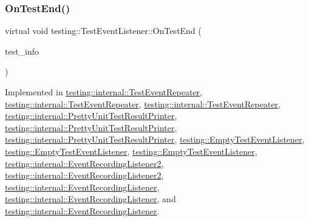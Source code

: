\subsubsection{\texorpdfstring{OnTestEnd()}{OnTestEnd()}\hspace{0.1cm}{\footnotesize\ttfamily [2/3]}}
{\footnotesize\ttfamily virtual void testing\+::\+Test\+Event\+Listener\+::\+On\+Test\+End (\begin{DoxyParamCaption}\item[{const \mbox{\hyperlink{classtesting_1_1_test_info}{Test\+Info}} \&}]{test\+\_\+info }\end{DoxyParamCaption})\hspace{0.3cm}{\ttfamily [pure virtual]}}



Implemented in \mbox{\hyperlink{classtesting_1_1internal_1_1_test_event_repeater_a0f524b2773bf2cbf6df1269975c5a79f}{testing\+::internal\+::\+Test\+Event\+Repeater}}, \mbox{\hyperlink{classtesting_1_1internal_1_1_test_event_repeater_a0f524b2773bf2cbf6df1269975c5a79f}{testing\+::internal\+::\+Test\+Event\+Repeater}}, \mbox{\hyperlink{classtesting_1_1internal_1_1_test_event_repeater_aa0f13bded9369aae1c78583d7276f8b1}{testing\+::internal\+::\+Test\+Event\+Repeater}}, \mbox{\hyperlink{classtesting_1_1internal_1_1_pretty_unit_test_result_printer_a085f90bb9f3128d8d8864c19e1e188ef}{testing\+::internal\+::\+Pretty\+Unit\+Test\+Result\+Printer}}, \mbox{\hyperlink{classtesting_1_1internal_1_1_pretty_unit_test_result_printer_a085f90bb9f3128d8d8864c19e1e188ef}{testing\+::internal\+::\+Pretty\+Unit\+Test\+Result\+Printer}}, \mbox{\hyperlink{classtesting_1_1internal_1_1_pretty_unit_test_result_printer_a6d4e21b076982d9eefb30373f1f5b6d2}{testing\+::internal\+::\+Pretty\+Unit\+Test\+Result\+Printer}}, \mbox{\hyperlink{classtesting_1_1_empty_test_event_listener_a709d7077c086c877d214231bc520ef90}{testing\+::\+Empty\+Test\+Event\+Listener}}, \mbox{\hyperlink{classtesting_1_1_empty_test_event_listener_a709d7077c086c877d214231bc520ef90}{testing\+::\+Empty\+Test\+Event\+Listener}}, \mbox{\hyperlink{classtesting_1_1_empty_test_event_listener_afd58d21005f0d0d0399fb114627545d3}{testing\+::\+Empty\+Test\+Event\+Listener}}, \mbox{\hyperlink{classtesting_1_1internal_1_1_event_recording_listener2_a8651cee935f60407bd65d0162a6d9629}{testing\+::internal\+::\+Event\+Recording\+Listener2}}, \mbox{\hyperlink{classtesting_1_1internal_1_1_event_recording_listener2_a8651cee935f60407bd65d0162a6d9629}{testing\+::internal\+::\+Event\+Recording\+Listener2}}, \mbox{\hyperlink{classtesting_1_1internal_1_1_event_recording_listener_ab374bf69a73cd7dd8fcef5aea1209728}{testing\+::internal\+::\+Event\+Recording\+Listener}}, \mbox{\hyperlink{classtesting_1_1internal_1_1_event_recording_listener_ab374bf69a73cd7dd8fcef5aea1209728}{testing\+::internal\+::\+Event\+Recording\+Listener}}, and \mbox{\hyperlink{classtesting_1_1internal_1_1_event_recording_listener_adb076f145cc20d9b27441b9c75da4b81}{testing\+::internal\+::\+Event\+Recording\+Listener}}.

